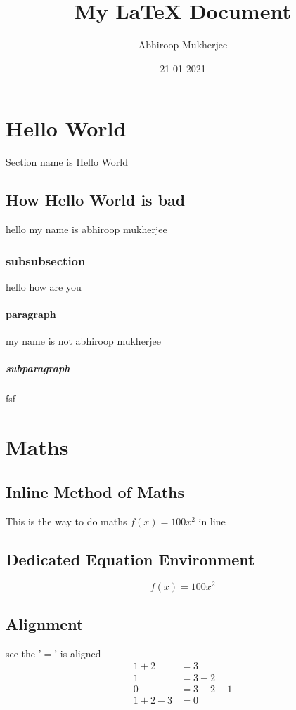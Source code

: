 \documentclass{article}
\author{Abhiroop Mukherjee}
\date{21-01-2021}
\title{My LaTeX Document}
\begin{document}
\maketitle
\newpage
\begin{doublespace}
    \tableofcontents
\end{doublespace}

\newpage
{}

\section{Hello World}
Section name is Hello World

\subsection{How Hello World is bad}
hello my name is abhiroop mukherjee

\subsubsection{subsubsection}
hello how are you

\paragraph{paragraph}
my name is not abhiroop mukherjee

\subparagraph{subparagraph}
fsf

\newpage
\section{Maths}

\subsection{Inline Method of Maths}
This is the way to do maths $f(x)=100x^2$ in line

\subsection{Dedicated Equation Environment}
\begin{equation*}
    f(x) = 100 x^2
\end{equation*}

\subsection{Alignment}
see the '$=$' is aligned
\begin{align*}
    1 + 2     & = 3     \\
    1         & = 3 - 2 \\
    0         & = 3-2-1 \\
    1 + 2 - 3 & =  0
\end{align*}
\end{document}
